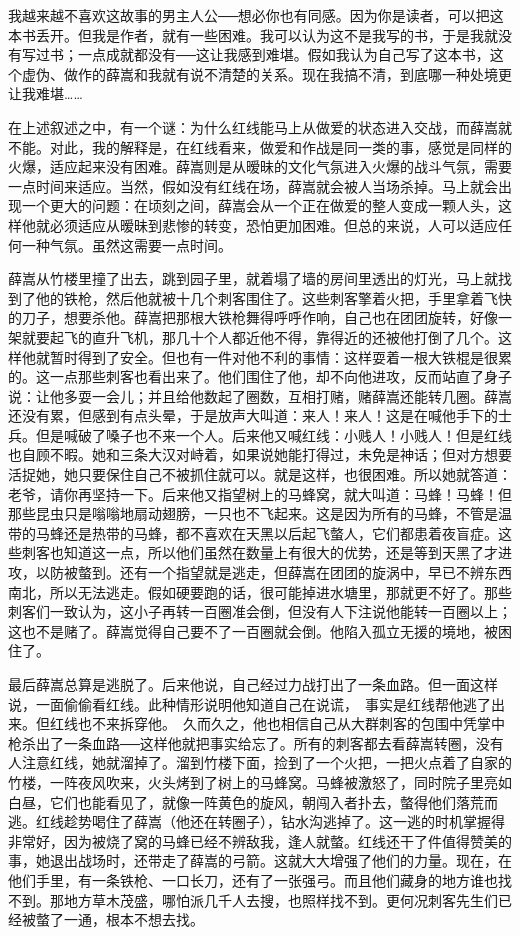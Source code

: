 我越来越不喜欢这故事的男主人公──想必你也有同感。因为你是读者，可以把这本书丢开。但我是作者，就有一些困难。我可以认为这不是我写的书，于是我就没有写过书；一点成就都没有──这让我感到难堪。假如我认为自己写了这本书，这个虚伪、做作的薛嵩和我就有说不清楚的关系。现在我搞不清，到底哪一种处境更让我难堪…… 

在上述叙述之中，有一个谜：为什么红线能马上从做爱的状态进入交战，而薛嵩就不能。对此，我的解释是，在红线看来，做爱和作战是同一类的事，感觉是同样的火爆，适应起来没有困难。薛嵩则是从暧昧的文化气氛进入火爆的战斗气氛，需要一点时间来适应。当然，假如没有红线在场，薛嵩就会被人当场杀掉。马上就会出现一个更大的问题：在顷刻之间，薛嵩会从一个正在做爱的整人变成一颗人头，这样他就必须适应从暧昧到悲惨的转变，恐怕更加困难。但总的来说，人可以适应任何一种气氛。虽然这需要一点时间。 

薛嵩从竹楼里撞了出去，跳到园子里，就着塌了墙的房间里透出的灯光，马上就找到了他的铁枪，然后他就被十几个刺客围住了。这些刺客擎着火把，手里拿着飞快的刀子，想要杀他。薛嵩把那根大铁枪舞得呼呼作响，自己也在团团旋转，好像一架就要起飞的直升飞机，那几十个人都近他不得，靠得近的还被他打倒了几个。这样他就暂时得到了安全。但也有一件对他不利的事情：这样耍着一根大铁棍是很累的。这一点那些刺客也看出来了。他们围住了他，却不向他进攻，反而站直了身子说：让他多耍一会儿；并且给他数起了圈数，互相打赌，赌薛嵩还能转几圈。薛嵩还没有累，但感到有点头晕，于是放声大叫道：来人！来人！这是在喊他手下的士兵。但是喊破了嗓子也不来一个人。后来他又喊红线：小贱人！小贱人！但是红线也自顾不暇。她和三条大汉对峙着，如果说她能打得过，未免是神话；但对方想要活捉她，她只要保住自己不被抓住就可以。就是这样，也很困难。所以她就答道：老爷，请你再坚持一下。后来他又指望树上的马蜂窝，就大叫道：马蜂！马蜂！但那些昆虫只是嗡嗡地扇动翅膀，一只也不飞起来。这是因为所有的马蜂，不管是温带的马蜂还是热带的马蜂，都不喜欢在天黑以后起飞螫人，它们都患着夜盲症。这些刺客也知道这一点，所以他们虽然在数量上有很大的优势，还是等到天黑了才进攻，以防被螫到。还有一个指望就是逃走，但薛嵩在团团的旋涡中，早已不辨东西南北，所以无法逃走。假如硬要跑的话，很可能掉进水塘里，那就更不好了。那些刺客们一致认为，这小子再转一百圈准会倒，但没有人下注说他能转一百圈以上；这也不是赌了。薛嵩觉得自己要不了一百圈就会倒。他陷入孤立无援的境地，被困住了。 

最后薛嵩总算是逃脱了。后来他说，自己经过力战打出了一条血路。但一面这样说，一面偷偷看红线。此种情形说明他知道自己在说谎，　事实是红线帮他逃了出来。但红线也不来拆穿他。　久而久之，他也相信自己从大群刺客的包围中凭掌中枪杀出了一条血路──这样他就把事实给忘了。所有的刺客都去看薛嵩转圈，没有人注意红线，她就溜掉了。溜到竹楼下面，捡到了一个火把，一把火点着了自家的竹楼，一阵夜风吹来，火头烤到了树上的马蜂窝。马蜂被激怒了，同时院子里亮如白昼，它们也能看见了，就像一阵黄色的旋风，朝闯入者扑去，螫得他们落荒而逃。红线趁势喝住了薛嵩（他还在转圈子），钻水沟逃掉了。这一逃的时机掌握得非常好，因为被烧了窝的马蜂已经不辨敌我，逢人就螫。红线还干了件值得赞美的事，她退出战场时，还带走了薛嵩的弓箭。这就大大增强了他们的力量。现在，在他们手里，有一条铁枪、一口长刀，还有了一张强弓。而且他们藏身的地方谁也找不到。那地方草木茂盛，哪怕派几千人去搜，也照样找不到。更何况刺客先生们已经被螫了一通，根本不想去找。 

